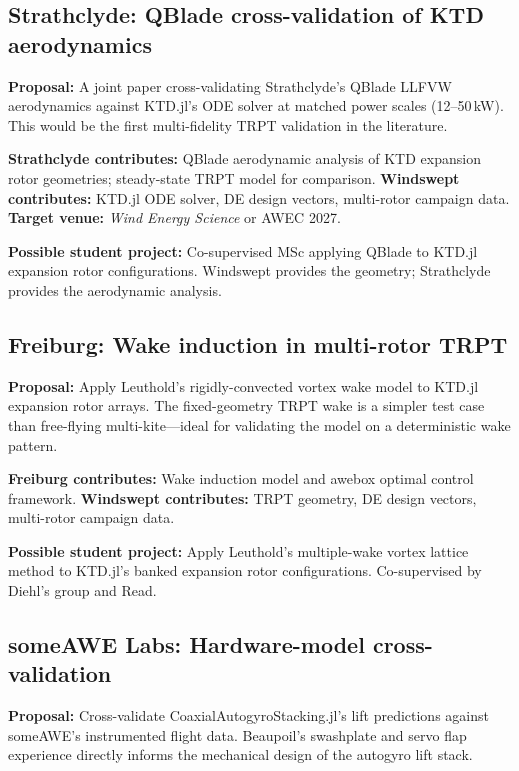 \documentclass[11pt,a4paper]{article}
\begin{document}
\subsection{Strathclyde: QBlade cross-validation of KTD aerodynamics}

\textbf{Proposal:} A joint paper cross-validating Strathclyde's QBlade LLFVW aerodynamics against KTD.jl's ODE solver at matched power scales (12--50\,kW).
This would be the first multi-fidelity TRPT validation in the literature.

\textbf{Strathclyde contributes:} QBlade aerodynamic analysis of KTD expansion rotor geometries; steady-state TRPT model for comparison.
\textbf{Windswept contributes:} KTD.jl ODE solver, DE design vectors, multi-rotor campaign data.
\textbf{Target venue:} \emph{Wind Energy Science} or AWEC 2027.

\textbf{Possible student project:} Co-supervised MSc applying QBlade to KTD.jl expansion rotor configurations.
Windswept provides the geometry; Strathclyde provides the aerodynamic analysis.

\subsection{Freiburg: Wake induction in multi-rotor TRPT}

\textbf{Proposal:} Apply Leuthold's rigidly-convected vortex wake model to KTD.jl expansion rotor arrays.
The fixed-geometry TRPT wake is a simpler test case than free-flying multi-kite---ideal for validating the model on a deterministic wake pattern.

\textbf{Freiburg contributes:} Wake induction model and awebox optimal control framework.
\textbf{Windswept contributes:} TRPT geometry, DE design vectors, multi-rotor campaign data.

\textbf{Possible student project:} Apply Leuthold's multiple-wake vortex lattice method \cite{leuthold2017} to KTD.jl's banked expansion rotor configurations.
Co-supervised by Diehl's group and Read.

\subsection{someAWE Labs: Hardware-model cross-validation}

\textbf{Proposal:} Cross-validate CoaxialAutogyroStacking.jl's lift predictions against someAWE's instrumented flight data.
Beaupoil's swashplate and servo flap experience directly informs the mechanical design of the autogyro lift stack.
\end{document}
